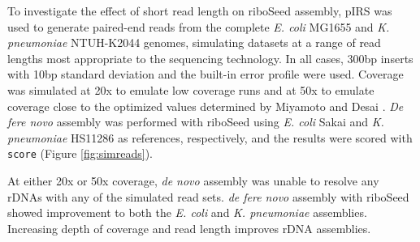 To investigate the effect of short read length on riboSeed assembly, pIRS \cite{Hu2012} was used to generate paired-end reads from the complete \textit{E. coli} MG1655 and \textit{K. pneumoniae} NTUH-K2044 genomes, simulating datasets at a range of read lengths most appropriate to the sequencing technology. In all cases, 300bp inserts with 10bp standard deviation and the built-in error profile were used. Coverage was simulated at 20x to emulate low coverage runs and at 50x to emulate coverage close to the optimized values determined by Miyamoto \cite{Miyamoto2014} and Desai \cite{Desai2013}. \textit{De fere novo} assembly was performed with riboSeed using \textit{E. coli} Sakai and \textit{K. pneumoniae} HS11286 as references, respectively, and the results were scored with \texttt{score} (Figure \ref{fig:simreads}).


At either 20x or 50x coverage, \textit{de novo} assembly was unable to resolve any rDNAs with any of the simulated read sets. \textit{de fere novo} assembly with riboSeed showed improvement to both the \textit{E. coli} and \textit{K. pneumoniae} assemblies. Increasing depth of coverage and read length improves rDNA assemblies.
